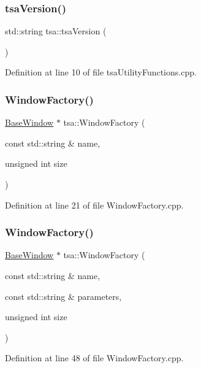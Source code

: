 \subsubsection{\texorpdfstring{tsa\+Version()}{tsaVersion()}}
{\footnotesize\ttfamily std\+::string tsa\+::tsa\+Version (\begin{DoxyParamCaption}{ }\end{DoxyParamCaption})}



Definition at line 10 of file tsa\+Utility\+Functions.\+cpp.

\mbox{\label{namespacetsa_ad40921629f819f9f2907db1fc8c1b63a}} 
\subsubsection{\texorpdfstring{Window\+Factory()}{WindowFactory()}\hspace{0.1cm}{\footnotesize\ttfamily [1/2]}}
{\footnotesize\ttfamily \hyperlink{classtsa_1_1_base_window}{Base\+Window} $\ast$ tsa\+::\+Window\+Factory (\begin{DoxyParamCaption}\item[{const std\+::string \&}]{name,  }\item[{unsigned int}]{size }\end{DoxyParamCaption})}



Definition at line 21 of file Window\+Factory.\+cpp.

\mbox{\label{namespacetsa_a1fe617a1ebaccc86dac0d06ccb16372e}} 
\subsubsection{\texorpdfstring{Window\+Factory()}{WindowFactory()}\hspace{0.1cm}{\footnotesize\ttfamily [2/2]}}
{\footnotesize\ttfamily \hyperlink{classtsa_1_1_base_window}{Base\+Window} $\ast$ tsa\+::\+Window\+Factory (\begin{DoxyParamCaption}\item[{const std\+::string \&}]{name,  }\item[{const std\+::string \&}]{parameters,  }\item[{unsigned int}]{size }\end{DoxyParamCaption})}



Definition at line 48 of file Window\+Factory.\+cpp.

